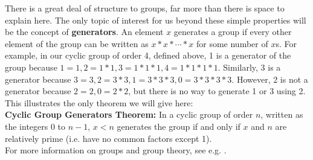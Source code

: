 \documentclass[11pt]{article}
\begin{document}
There is a great deal of structure to groups, far more than there is space to explain here. The only topic of interest for us beyond these simple properties will be the concept of \textbf{generators}. An element $x$ generates a group if every other element of the group can be written as $x*x*\cdots*x$ for some number of $x$s. For example, in our cyclic group of order 4, defined above, 1 is a generator of the group because $1 = 1, 2 = 1 * 1, 3 = 1 * 1 * 1, 4 = 1 * 1 * 1 * 1$. Similarly, 3 is a generator because $3 = 3, 2 = 3 * 3, 1 = 3 * 3 * 3, 0 = 3 * 3 * 3 * 3$. However, 2 is not a generator because $2 = 2, 0 = 2 * 2$, but there is no way to generate 1 or 3 using 2. This illustrates the only theorem we will give here: \\[11pt]
\textbf{Cyclic Group Generators Theorem:} In a cyclic group of order $n$, written as the integers $0$ to $n-1$, $x < n$ generates the group if and only if $x$ and $n$ are relatively prime (i.e. have no common factors except 1). \\[11pt] 
For more information on groups and group theory, see e.g. \cite{Lang2002}.
 
\end{document}
